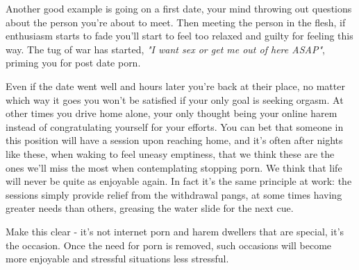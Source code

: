 \documentclass[easypeasy.tex]{subfiles}
\begin{document}
Another good example is going on a first date, your mind throwing out questions about the person you're about to meet. Then meeting the person in the flesh, if enthusiasm starts to fade you'll start to feel too relaxed and guilty for feeling this way. The tug of war has started, \textit{"I want sex or get me out of here ASAP"}, priming you for post date porn.

Even if the date went well and hours later you're back at their place, no matter which way it goes you won't be satisfied if your only goal is seeking orgasm. At other times you drive home alone, your only thought being your online harem instead of congratulating yourself for your efforts. You can bet that someone in this position will have a session upon reaching home, and it's often after nights like these, when waking to feel uneasy emptiness, that we think these are the ones we'll miss the most when contemplating stopping porn. We think that life will never be quite as enjoyable again. In fact it's the same principle at work: the sessions simply provide relief from the withdrawal pangs, at some times having greater needs than others, greasing the water slide for the next cue.

Make this clear - it's not internet porn and harem dwellers that are special, it's the occasion. Once the need for porn is removed, such occasions will become more enjoyable and stressful situations less stressful.
\end{document}
